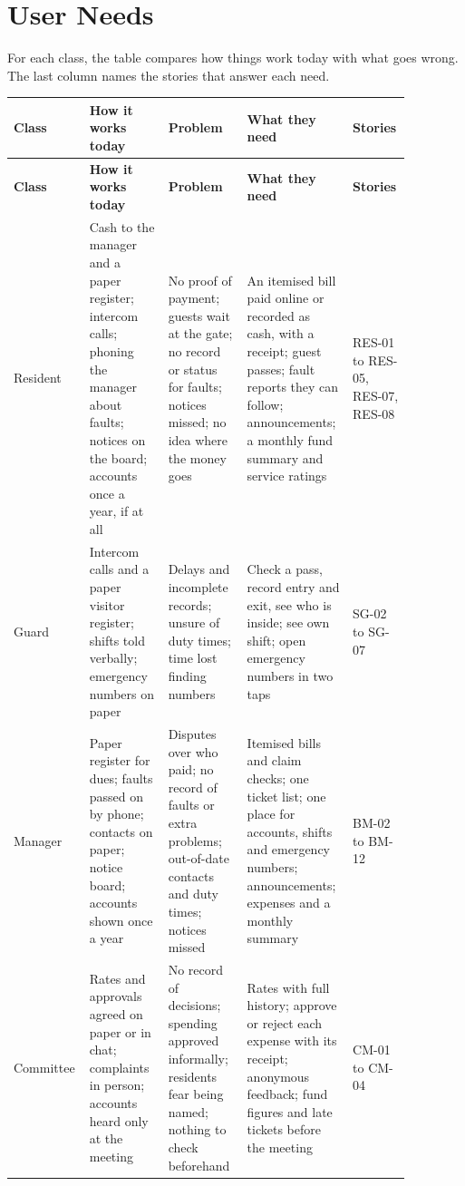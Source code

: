 \documentclass[11pt,a4paper]{report}
\begin{document}
\section{User Needs}

For each class, the table compares how things work today with what goes wrong. The last column names the stories that answer each need.

{\small\setlength{\LTpre}{6pt}\setlength{\LTpost}{6pt}
\begin{longtable}{>{\raggedright\arraybackslash}p{0.115\linewidth}>{\raggedright\arraybackslash}p{0.191\linewidth}>{\raggedright\arraybackslash}p{0.191\linewidth}>{\raggedright\arraybackslash}p{0.253\linewidth}>{\raggedright\arraybackslash}p{0.124\linewidth}}
\toprule
\textbf{Class} & \textbf{How it works today} & \textbf{Problem} & \textbf{What they need} & \textbf{Stories} \\
\midrule
\endfirsthead
\toprule
\textbf{Class} & \textbf{How it works today} & \textbf{Problem} & \textbf{What they need} & \textbf{Stories} \\
\midrule
\endhead
\bottomrule
\endlastfoot
Resident & Cash to the manager and a paper register; intercom calls; phoning the manager about faults; notices on the board; accounts once a year, if at all & No proof of payment; guests wait at the gate; no record or status for faults; notices missed; no idea where the money goes & An itemised bill paid online or recorded as cash, with a receipt; guest passes; fault reports they can follow; announcements; a monthly fund summary and service ratings & RES-01 to RES-05, RES-07, RES-08 \\
Guard & Intercom calls and a paper visitor register; shifts told verbally; emergency numbers on paper & Delays and incomplete records; unsure of duty times; time lost finding numbers & Check a pass, record entry and exit, see who is inside; see own shift; open emergency numbers in two taps & SG-02 to SG-07 \\
Manager & Paper register for dues; faults passed on by phone; contacts on paper; notice board; accounts shown once a year & Disputes over who paid; no record of faults or extra problems; out-of-date contacts and duty times; notices missed & Itemised bills and claim checks; one ticket list; one place for accounts, shifts and emergency numbers; announcements; expenses and a monthly summary & BM-02 to BM-12 \\
Committee & Rates and approvals agreed on paper or in chat; complaints in person; accounts heard only at the meeting & No record of decisions; spending approved informally; residents fear being named; nothing to check beforehand & Rates with full history; approve or reject each expense with its receipt; anonymous feedback; fund figures and late tickets before the meeting & CM-01 to CM-04 \\

\end{longtable}}
\end{document}
